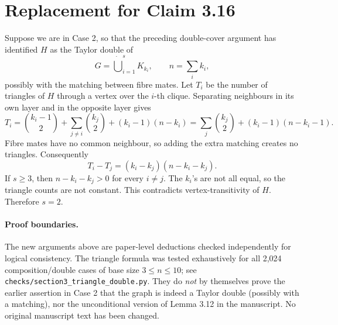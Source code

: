 \documentclass[11pt,a4paper]{article}
\begin{document}
\section*{Replacement for Claim 3.16}

Suppose we are in Case 2, so that the preceding
double-cover argument has identified \(H\) as the
Taylor double of
\[
 G=\dot\bigcup_{i=1}^s K_{k_i},\qquad
 n=\sum_i k_i,
\]
possibly with the matching between fibre mates.
Let \(T_i\) be the number of triangles of \(H\) through
a vertex over the \(i\)-th clique. Separating
neighbours in its own layer and in the opposite layer
gives
\[
 T_i=\binom{k_i-1}{2}
       +\sum_{j\ne i}\binom{k_j}{2}
       +(k_i-1)(n-k_i)
     =\sum_j\binom{k_j}{2}
       +(k_i-1)(n-k_i-1).
\]
Fibre mates have no common neighbour, so adding the
extra matching creates no triangles. Consequently
\[
 T_i-T_j=(k_i-k_j)(n-k_i-k_j).
\]
If \(s\ge3\), then \(n-k_i-k_j>0\) for every \(i\ne j\).
The \(k_i\)'s are not all equal, so the triangle counts
are not constant. This contradicts vertex-transitivity
of \(H\). Therefore \(s=2\).

\paragraph{Proof boundaries.}
The new arguments above are paper-level deductions
checked independently for logical consistency.
The triangle formula was tested exhaustively for
all 2,024 composition/double cases of base size
\(3\le n\le10\); see
\texttt{checks/section3\_triangle\_double.py}.
They do \emph{not} by themselves prove the earlier
assertion in Case 2 that the graph is indeed a
Taylor double (possibly with a matching), nor the
unconditional version of Lemma 3.12 in the manuscript.
No original manuscript text has been changed.
\end{document}

